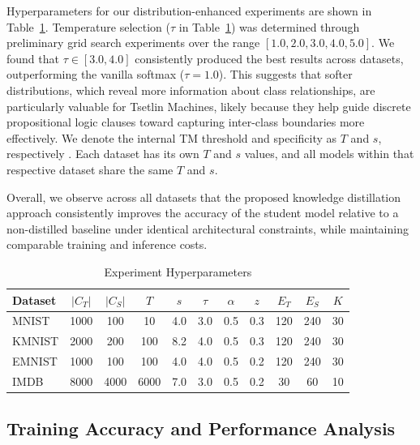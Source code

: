 \documentclass[sn-mathphys-num]{sn-jnl}%
\theoremstyle{thmstyleone}%
\theoremstyle{thmstyletwo}%
\theoremstyle{thmstylethree}%
\begin{document}
Hyperparameters for our distribution-enhanced experiments are shown in Table~\ref{tab:hyperparams-dkd}. Temperature selection ($\tau$ in Table~\ref{tab:hyperparams-dkd}) was determined through preliminary grid search experiments over the range $[1.0, 2.0, 3.0, 4.0, 5.0]$. We found that $\tau \in [3.0, 4.0]$ consistently produced the best results across datasets, outperforming the vanilla softmax ($\tau = 1.0$). This suggests that softer distributions, which reveal more information about class relationships, are particularly valuable for Tsetlin Machines, likely because they help guide discrete propositional logic clauses toward capturing inter-class boundaries more effectively. We denote the internal TM threshold and specificity as $T$ and $s$, respectively \cite{granmo2018tsetlin}. Each dataset has its own $T$ and $s$ values, and all models within that respective dataset share the same $T$ and $s$.

Overall, we observe across all datasets that the proposed knowledge distillation approach consistently improves the accuracy of the student model relative to a non-distilled baseline under identical architectural constraints, while maintaining comparable training and inference costs.

\begin{table}
	\centering
	\caption{Experiment Hyperparameters }
	\begin{tabular}{l|cccccccccc}
	\hline
	Dataset & $|C_T|$ & $|C_S|$ & $T$ & $s$ & $\tau$ & $\alpha$ & $z$ & $E_T$ & $E_S$ & $K$ \\
	\hline
	MNIST & 1000 & 100 & 10 & 4.0 & 3.0 & 0.5 & 0.3 & 120 & 240 & 30 \\
	KMNIST & 2000 & 200 & 100 & 8.2 & 4.0 & 0.5 & 0.3 & 120 & 240 & 30 \\
	EMNIST & 1000 & 100 & 100 & 4.0 & 4.0 & 0.5 & 0.2 & 120 & 240 & 30 \\
	IMDB & 8000 & 4000 & 6000 & 7.0 & 3.0 & 0.5 & 0.2 & 30 & 60 & 10 \\\hline
	\end{tabular}
	\label{tab:hyperparams-dkd}
\end{table}

\subsection{Training Accuracy and Performance Analysis} \label{sec:trapa}
\end{document}
